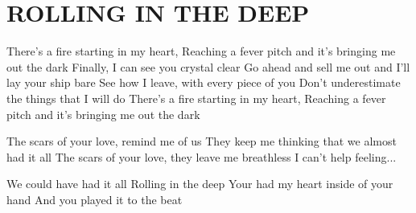 \documentclass[../../../songbook.tex]{subfiles}
\begin{document}
\TabPositions{9cm} %
\section*{ROLLING IN THE DEEP}
{}
\vspace{0.5cm}
There's a fire starting in my heart,						 \newline	
Reaching a fever pitch and it's bringing me out the dark	 \newline	
Finally, I can see you crystal clear						 \newline	
Go ahead and sell me out and I'll lay your ship bare		 \newline	
See how I leave, with every piece of you					 \newline	
Don't underestimate the things that I will do				 \newline	
There's a fire starting in my heart,						 \newline	
Reaching a fever pitch and it's bringing me out the dark	 \newline	

\-\hspace{1cm} The scars of your love, remind me of us			 \newline	
\-\hspace{1cm} They keep me thinking that we almost had it all	 \newline	
\-\hspace{1cm} The scars of your love, they leave me breathless	 \newline	
\-\hspace{1cm} I can't help feeling...							 \newline	

\-\hspace{1cm} We could have had it all					 \newline	
\-\hspace{1cm} Rolling in the deep						 \newline	
\-\hspace{1cm} Your had my heart inside of your hand	 \newline	
\-\hspace{1cm} And you played it to the beat			 \newline	
\end{document}
